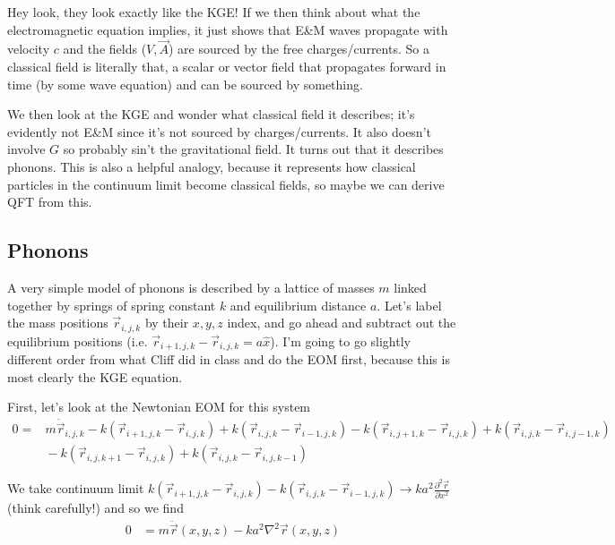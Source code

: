 \documentclass[12pt]{article}
\newcommand{\ptd}[2]{\frac{\partial^2 #1}{\partial#2^2}}
\begin{document}
Hey look, they look exactly like the KGE! If we then think about what the electromagnetic equation implies, it just shows that E\&M waves propagate with velocity $c$ and the fields ($V, \vec{A}$) are sourced by the free charges/currents. So a classical field is literally that, a scalar or vector field that propagates forward in time (by some wave equation) and can be sourced by something.

We then look at the KGE and wonder what classical field it describes; it's evidently not E\&M since it's not sourced by charges/currents. It also doesn't involve $G$ so probably sin't the gravitational field. It turns out that it describes phonons. This is also a helpful analogy, because it represents how classical particles in the continuum limit become classical fields, so maybe we can derive QFT from this. 

\subsection{Phonons}

A very simple model of phonons is described by a lattice of masses $m$ linked together by springs of spring constant $k$ and equilibrium distance $a$. Let's label the mass positions $\vec{r}_{i,j,k}$ by their $x,y,z$ index, and go ahead and subtract out the equilibrium positions (i.e. $\vec{r}_{i+1,j,k} - \vec{r}_{i,j,k} = a\hat{x}$). I'm going to go slightly different order from what Cliff did in class and do the EOM first, because this is most clearly the KGE equation.

First, let's look at the Newtonian EOM for this system
\begin{align}
    0 =& m\ddot{\vec{r}}_{i,j,k} - k\left( \vec{r}_{i+1, j, k} - \vec{r}_{i,j,k} \right) + k\left( \vec{r}_{i,j,k} - \vec{r}_{i-1,j,k} \right) - k\left( \vec{r}_{i, j+1, k} - \vec{r}_{i,j,k} \right) + k\left( \vec{r}_{i,j,k} - \vec{r}_{i,j-1,k} \right)\nonumber\\
    &{} - k\left( \vec{r}_{i, j, k+1} - \vec{r}_{i,j,k} \right) + k\left( \vec{r}_{i,j,k} - \vec{r}_{i,j,k-1} \right)
\end{align}

We take continuum limit $k\left( \vec{r}_{i+1, j, k} - \vec{r}_{i,j,k} \right) - k\left( \vec{r}_{i,j,k} - \vec{r}_{i-1,j,k} \right) \to ka^2 \ptd{\vec{r}}{x}$ (think carefully!) and so we find
\begin{align}
    0 &= m\ddot{\vec{r}}(x,y,z) - ka^2\nabla^2 \vec{r}(x,y,z)
\end{align}
\end{document}

